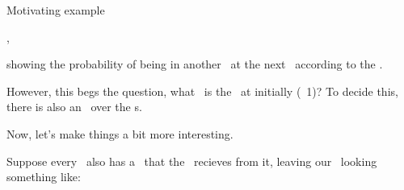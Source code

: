 \documentclass{rl_theory/rl_theory}
\begin{document}
\begin{part} {Motivating example}
\begin{itemize}
\begin{center}
,
      \end{center}
  \end{itemize}
  showing the probability of being in another \til\ at the next \stp\ according to the \trd.

  However, this begs the question, what \til\ is the \agt\ at initially (\stp\ 1)? 
  To decide this, there is also an \ind\ over the \til{}s.

  \newpage

  Now, let's make things a bit more interesting. 

  Suppose every \til\ also has a \rwd\ that the \agt\ recieves from it, leaving our \brd\ looking something like:
\end{part}
\end{document}
